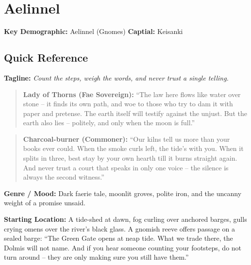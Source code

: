 
\section{Aelinnel}
\label{chap:aelinnel-gnomes}

\textbf{Key Demographic: } Aelinnel (Gnomes)
\textbf{Captial: } Keisanki

\subsection*{Quick Reference}
\textbf{Tagline:} \textit{Count the steps, weigh the words, and never trust a single telling.}

\begin{quote}
  \textbf{Lady of Thorns (Fae Sovereign):}  
  ``The law here flows like water over stone -- it finds its own path, and woe to those who try to dam it with paper and pretense. The earth itself will testify against the unjust. But the earth also lies -- politely, and only when the moon is full.''
\end{quote}

\begin{quote}
  \textbf{Charcoal-burner (Commoner):}  
  ``Our kilns tell us more than your books ever could. When the smoke curls left, the tide's with you. When it splits in three, best stay by your own hearth till it burns straight again. And never trust a court that speaks in only one voice -- the silence is always the second witness.''
\end{quote}

\textbf{Genre / Mood:} Dark faerie tale, moonlit groves, polite iron, and the uncanny weight of a promise unsaid.

\textbf{Starting Location:} A tide-shed at dawn, fog curling over anchored barges, gulls crying omens over the river's black glass. A gnomish reeve offers passage on a sealed barge: ``The Green Gate opens at neap tide. What we trade there, the Dolmis will not name. And if you hear someone counting your footsteps, do not turn around -- they are only making sure you still have them.''

